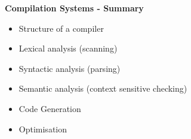 %
%
\begin{slide}{}
{\bf Compilation Systems - Summary}

\begin{itemize}
\item Structure of a compiler
\item Lexical analysis (scanning)
\item Syntactic analysis (parsing)
\item Semantic analysis (context sensitive checking)
\item Code Generation
\item Optimisation
\end{itemize}
\end{slide}
